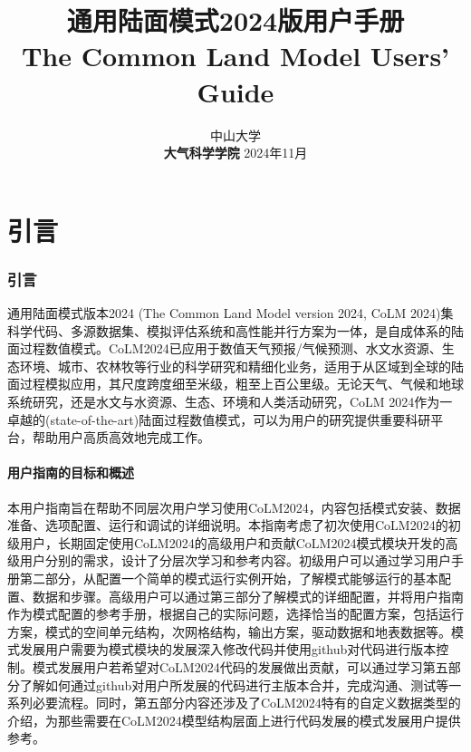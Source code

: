 \documentclass[a4paper,12pt,twoside]{article}
\begin{document}
\title{\huge {\bf 通用陆面模式2024版用户手册}\\
\vspace{6mm}
\fontsize {22}{24}
\bf{ The Common Land Model Users' Guide}
\fontsize {20}{23}
 \vskip 2in
}

\author{
 \large{ 中山大学 }\\[2ex]
 {\bf 大气科学学院}
 \vskip 2in
 \upshape
 \large
 \vskip 0.5in
 2024年11月
}

\normallinespacing
\maketitle

\preface

\clearpage 
\pagestyle{fancy}

\tableofcontents
\clearpage
{}

\part{引言}
\section{引言}

通用陆面模式版本2024 (The Common Land Model version 2024, CoLM 2024)集科学代码、多源数据集、模拟评估系统和高性能并行方案为一体，是自成体系的陆面过程数值模式。CoLM2024已应用于数值天气预报/气候预测、水文水资源、生态环境、城市、农林牧等行业的科学研究和精细化业务，适用于从区域到全球的陆面过程模拟应用，其尺度跨度细至米级，粗至上百公里级。无论天气、气候和地球系统研究，还是水文与水资源、生态、环境和人类活动研究，CoLM 2024作为一卓越的(state-of-the-art)陆面过程数值模式，可以为用户的研究提供重要科研平台，帮助用户高质高效地完成工作。

\subsection{用户指南的目标和概述}
本用户指南旨在帮助不同层次用户学习使用CoLM2024，内容包括模式安装、数据准备、选项配置、运行和调试的详细说明。本指南考虑了初次使用CoLM2024的初级用户，长期固定使用CoLM2024的高级用户和贡献CoLM2024模式模块开发的高级用户分别的需求，设计了分层次学习和参考内容。初级用户可以通过学习用户手册第二部分，从配置一个简单的模式运行实例开始，了解模式能够运行的基本配置、数据和步骤。高级用户可以通过第三部分了解模式的详细配置，并将用户指南作为模式配置的参考手册，根据自己的实际问题，选择恰当的配置方案，包括运行方案，模式的空间单元结构，次网格结构，输出方案，驱动数据和地表数据等。模式发展用户需要为模式模块的发展深入修改代码并使用github对代码进行版本控制。模式发展用户若希望对CoLM2024代码的发展做出贡献，可以通过学习第五部分了解如何通过github对用户所发展的代码进行主版本合并，完成沟通、测试等一系列必要流程。同时，第五部分内容还涉及了CoLM2024特有的自定义数据类型的介绍，为那些需要在CoLM2024模型结构层面上进行代码发展的模式发展用户提供参考。
\end{document}
